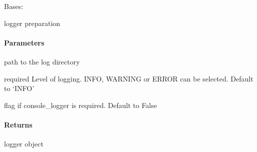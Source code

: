 \documentclass[letterpaper,10pt,english]{sphinxmanual}
\begin{document}
\begin{fulllineitems}
\label{\detokenize{autoapi/logging_utils/index:logging_utils.Logger}}
\pysigstartsignatures
{}
\pysigstopsignatures
\sphinxAtStartPar
Bases: 

\sphinxAtStartPar
logger preparation


\paragraph{Parameters}
\label{\detokenize{autoapi/logging_utils/index:parameters}}\begin{description}
\sphinxAtStartPar
path to the log directory

\sphinxAtStartPar
required Level of logging. INFO, WARNING or ERROR can be selected. Default to ‘INFO’

\sphinxAtStartPar
flag if console\_logger is required. Default to False

\end{description}


\paragraph{Returns}
\label{\detokenize{autoapi/logging_utils/index:returns}}\begin{description}
\sphinxAtStartPar
logger object

\end{description}

\begin{fulllineitems}
\label{\detokenize{autoapi/logging_utils/index:logging_utils.Logger._make_level}}
\pysigstartsignatures
{}
\pysigstopsignatures
\end{fulllineitems}


\begin{fulllineitems}
\label{\detokenize{autoapi/logging_utils/index:logging_utils.Logger.make_logger}}
\pysigstartsignatures
{}
\pysigstopsignatures
\end{fulllineitems}


\end{fulllineitems}
\end{document}
